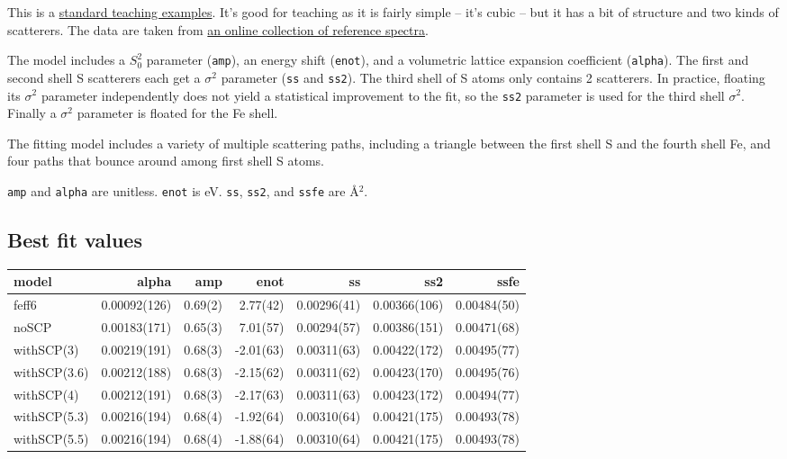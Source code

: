 \documentclass[11pt]{article}
\begin{document}
This is a
\href{https://github.com/bruceravel/XAS-Education/tree/master/Examples/FeS2}{standard
  teaching examples}. It's good for teaching as it is fairly simple --
it's cubic -- but it has a bit of structure and two kinds of
scatterers.  The data are taken from
\href{http://cars.uchicago.edu/~newville/ModelLib/search.html}{an
  online collection of reference spectra}.

The model includes a $S_0^2$ parameter (\texttt{amp}), an energy shift
(\texttt{enot}), and a volumetric lattice expansion coefficient
(\texttt{alpha}). The first and second shell S scatterers each get a
$\sigma^2$ parameter (\texttt{ss} and \texttt{ss2}). The third shell
of S atoms only contains 2 scatterers. In practice, floating its
$\sigma^2$ parameter independently does not yield a statistical
improvement to the fit, so the \texttt{ss2} parameter is used for the
third shell $\sigma^2$.  Finally a $\sigma^2$ parameter is floated for
the Fe shell.

The fitting model includes a variety of multiple scattering paths,
including a triangle between the first shell S and the fourth shell
Fe, and four paths that bounce around among first shell S atoms.

\texttt{amp} and \texttt{alpha} are unitless. \texttt{enot} is
eV. \texttt{ss}, \texttt{ss2}, and \texttt{ssfe} are {\AA}$^2$.

\subsection{Best fit values}
\label{sec:orgheadline14}

\begin{center}
  \footnotesize
  \begin{tabular}{lrrrrrr}
    model & alpha & amp & enot & ss & ss2 & ssfe\\
    \hline
    feff6        & 0.00092(126) & 0.69(2) &  2.77(42) & 0.00296(41) & 0.00366(106) & 0.00484(50)\\
    noSCP        & 0.00183(171) & 0.65(3) &  7.01(57) & 0.00294(57) & 0.00386(151) & 0.00471(68)\\
    withSCP(3)   & 0.00219(191) & 0.68(3) & -2.01(63) & 0.00311(63) & 0.00422(172) & 0.00495(77)\\
    withSCP(3.6) & 0.00212(188) & 0.68(3) & -2.15(62) & 0.00311(62) & 0.00423(170) & 0.00495(76)\\
    withSCP(4)   & 0.00212(191) & 0.68(3) & -2.17(63) & 0.00311(63) & 0.00423(172) & 0.00494(77)\\
    withSCP(5.3) & 0.00216(194) & 0.68(4) & -1.92(64) & 0.00310(64) & 0.00421(175) & 0.00493(78)\\
    withSCP(5.5) & 0.00216(194) & 0.68(4) & -1.88(64) & 0.00310(64) & 0.00421(175) & 0.00493(78)\\
  \end{tabular}
\end{center}
\end{document}
